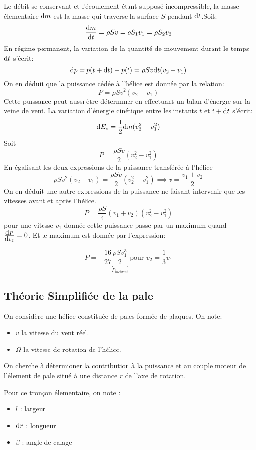 \documentclass[main.tex]{subfiles}
\begin{document}
  \vspace{1em}
  Le débit se conservant et l'écoulement étant supposé incompressible, la masse élementaire $\d m$ est la masse qui traverse la surface $S$ pendant $\d t$.Soit:
  \[
    \deriv[m]{t} = \rho S v = \rho S_1v_1 = \rho S_2 v_2
  \]
  En régime permanent, la variation de la quantité de mouvement durant le temps $\d t$ s'écrit:
  \[
    \d p = p(t+\d t) -p(t) = \rho S v \d t (v_2-v_1)
  \]
  On en déduit que la puissance cédée à l'hélice est donnée par la relation:
  \[
    P = \rho S v^2 (v_2-v_1)
  \]
  Cette puissance peut aussi être déterminer en effectuant un bilan d'énergie sur la veine de vent. La variation d'énergie cinétique entre les instants $t$ et $t+\d t$ s'écrit:
  \[
    \d E_{c} = \frac{1}{2}\d m (v_2^2-v_1^2)
  \]
  Soit
  \[
    P = \frac{\rho S v}{2}(v_2^2-v_1^2)
  \]
  En égalisant les deux expressions de la puissance transférée à l'hélice
  \[
    \rho S v^2 (v_2-v_1) = \frac{\rho S v}{2}(v_2^2-v_1^2) \implies \boxed{v =\frac{v_1+v_2}{2}}
  \]
  On en déduit une autre expressions de la puissance ne faisant intervenir que les vitesses avant et après l'hélice.
  \[
    P= \frac{\rho S}{4} (v_1+v_2) (v_2^2-v_1^2)
  \]
  pour une vitesse $v_1$ donnée cette puissance passe par un maximum quand $\deriv[P]{v_2} = 0$. Et le maximum est donnée par l'expression:

\[
  P = -\frac{16}{27}\underbracket{\frac{\rho S v_1^3}{2} }_{P_{incident}} \text{ pour } v_2 = \frac{1}{3}v_1
\]

\subsection{Théorie Simplifiée de la pale}
On considère une hélice constituée de pales formée de plaques. On note:
\begin{itemize}
\item $v$ la vitesse du vent réel.
\item $\Omega$ la vitesse de rotation de l'hélice.
\end{itemize}

On cherche à détermioner la contribution à la puissance et au couple moteur de l'élement de pale situé à une distance $r$ de l'axe de rotation.


Pour ce tronçon élementaire, on note :
\begin{itemize}
\item $l$ : largeur
\item $\d r$ : longueur
\item $\beta$ : angle de calage
\end{itemize}
\end{document}
